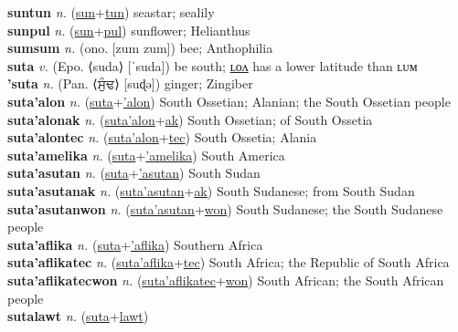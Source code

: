 \textbf{suntun} \textit{n.} (\hyperref[sun]{sun}+\hyperref[tun]{tun})
seastar; sealily \label{suntun} \\
\textbf{sunpul} \textit{n.} (\hyperref[sun]{sun}+\hyperref[pul]{pul})
sunflower; Helianthus \label{sunpul} \\
\textbf{sumsum} \textit{n.} (ono. [zum zum])
bee; Anthophilia \label{sumsum} \\
\textbf{suta} \textit{v.} (Epo. ⟨suda⟩ [ˈsuda])
be south; \hyperref[sutalon]{ʟᴏᴧ} has a lower latitude than ʟᴜᴍ \label{suta} \\
\textbf{'suta} \textit{n.} (Pan. ⟨ਸੁੰਢ⟩ [suɖə])
ginger; Zingiber \label{'suta} \\
\textbf{suta'alon} \textit{n.} (\hyperref[suta]{suta}+\hyperref['alon]{'alon})
South Ossetian; Alanian; the South Ossetian people \label{suta'alon} \\
\textbf{suta'alonak} \textit{n.} (\hyperref[suta'alon]{suta'alon}+\hyperref[ak]{ak})
South Ossetian; of South Ossetia \label{suta'alonak} \\
\textbf{suta'alontec} \textit{n.} (\hyperref[suta'alon]{suta'alon}+\hyperref[tec]{tec})
South Ossetia; Alania \label{suta'alontec} \\
\textbf{suta'amelika} \textit{n.} (\hyperref[suta]{suta}+\hyperref['amelika]{'amelika})
South America \label{suta'amelika} \\
\textbf{suta'asutan} \textit{n.} (\hyperref[suta]{suta}+\hyperref['asutan]{'asutan})
South Sudan \label{suta'asutan} \\
\textbf{suta'asutanak} \textit{n.} (\hyperref[suta'asutan]{suta'asutan}+\hyperref[ak]{ak})
South Sudanese; from South Sudan \label{suta'asutanak} \\
\textbf{suta'asutanwon} \textit{n.} (\hyperref[suta'asutan]{suta'asutan}+\hyperref[won]{won})
South Sudanese; the South Sudanese people \label{suta'asutanwon} \\
\textbf{suta'aflika} \textit{n.} (\hyperref[suta]{suta}+\hyperref['aflika]{'aflika})
Southern Africa \label{suta'aflika} \\
\textbf{suta'aflikatec} \textit{n.} (\hyperref[suta'aflika]{suta'aflika}+\hyperref[tec]{tec})
South Africa; the Republic of South Africa \label{suta'aflikatec} \\
\textbf{suta'aflikatecwon} \textit{n.} (\hyperref[suta'aflikatec]{suta'aflikatec}+\hyperref[won]{won})
South African; the South African people \label{suta'aflikatecwon} \\
\textbf{sutalawt} \textit{n.} (\hyperref[suta]{suta}+\hyperref[lawt]{lawt})
